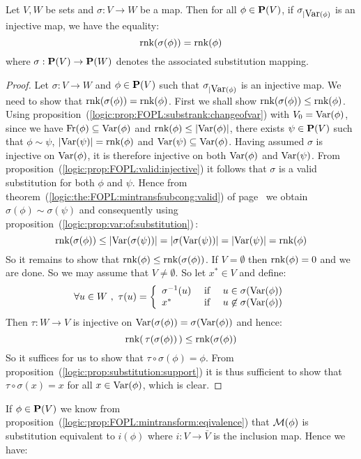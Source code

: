 \begin{prop}\label{logic:prop:FOPL:substrank:injective}
Let $V,W$ be sets and $\sigma:V\to W$ be a map. Then for all
$\phi\in\mbox{${\bf P}(V)$}$, if $\sigma_{|\mbox{\rm Var}(\phi)}$ is an injective map, we have
the equality:
    \[
    \mbox{\rm rnk}(\sigma(\phi))=\mbox{\rm rnk}(\phi)
    \]
where $\sigma:\mbox{${\bf P}(V)$}\to{\bf P}(W)$ denotes the associated substitution
mapping.
\end{prop}
\begin{proof}
Let $\sigma:V\to W$ and $\phi\in\mbox{${\bf P}(V)$}$ such that
$\sigma_{|\mbox{\rm Var}(\phi)}$ is an injective map. We need to show that
$\mbox{\rm rnk}(\sigma(\phi))=\mbox{\rm rnk}(\phi)$. First we shall show
$\mbox{\rm rnk}(\sigma(\phi))\leq\mbox{\rm rnk}(\phi)$. Using
proposition~(\ref{logic:prop:FOPL:substrank:changeofvar}) with
$V_{0}=\mbox{\rm Var}(\phi)$, since we have $\mbox{\rm Fr}(\phi)\subseteq\mbox{\rm Var}(\phi)$
and $\mbox{\rm rnk}(\phi)\leq|\mbox{\rm Var}(\phi)|$, there exists $\psi\in\mbox{${\bf P}(V)$}$ such
that $\phi\sim\psi$, $|\mbox{\rm Var}(\psi)|=\mbox{\rm rnk}(\phi)$ and
$\mbox{\rm Var}(\psi)\subseteq\mbox{\rm Var}(\phi)$. Having assumed $\sigma$ is
injective on $\mbox{\rm Var}(\phi)$, it is therefore injective on both
$\mbox{\rm Var}(\phi)$ and $\mbox{\rm Var}(\psi)$. From
proposition~(\ref{logic:prop:FOPL:valid:injective}) it follows that
$\sigma$ is a valid substitution for both $\phi$ and $\psi$. Hence
from theorem~(\ref{logic:the:FOPL:mintransfsubcong:valid}) of
page~\pageref{logic:the:FOPL:mintransfsubcong:valid} we obtain
$\sigma(\phi)\sim\sigma(\psi)$ and consequently using
proposition~(\ref{logic:prop:var:of:substitution})\,:
    \[
    \mbox{\rm rnk}(\sigma(\phi))\leq|\mbox{\rm Var}(\sigma(\psi))|=|\sigma(\mbox{\rm Var}(\psi))|
    =|\mbox{\rm Var}(\psi)|=\mbox{\rm rnk}(\phi)
    \]
So it remains to show that $\mbox{\rm rnk}(\phi)\leq\mbox{\rm rnk}(\sigma(\phi))$. If
$V=\emptyset$ then $\mbox{\rm rnk}(\phi)=0$ and we are done. So we may assume
that $V\neq\emptyset$. So let $x^{*}\in V$ and define:
    \[
    \forall u\in W\ ,\ \tau(u)=\left\{
        \begin{array}{lcl}
        \sigma^{-1}(u)&\mbox{\ if\ }&u\in\sigma(\var(\phi))\\
        x^{*}&\mbox{\ if\ }&u\not\in\sigma(\var(\phi))
        \end{array}
    \right.
    \]
Then $\tau:W\to V$ is injective on
$\mbox{\rm Var}(\sigma(\phi))=\sigma(\mbox{\rm Var}(\phi))$ and hence:
    \[
    \mbox{\rm rnk}(\,\tau(\sigma(\phi))\,)\leq\mbox{\rm rnk}(\sigma(\phi))
    \]
So it suffices for us to show that  $\tau\circ\sigma(\phi)=\phi$.
From proposition~(\ref{logic:prop:substitution:support}) it is thus
sufficient to show that $\tau\circ\sigma(x)=x$ for all
$x\in\mbox{\rm Var}(\phi)$, which is clear.
\end{proof}

If $\phi\in\mbox{${\bf P}(V)$}$ we know from
proposition~(\ref{logic:prop:FOPL:mintransform:eqivalence}) that
${\cal M}(\phi)$ is substitution equivalent to $i(\phi)$ where
$i:V\to\bar{V}$ is the inclusion map. Hence we have:


